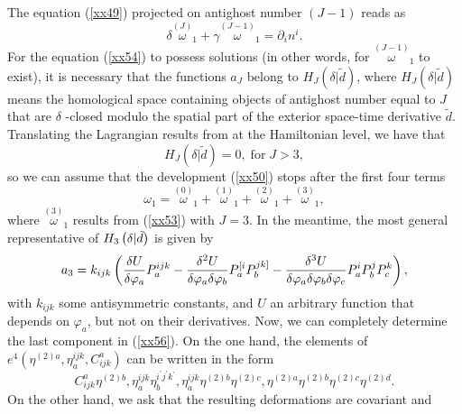 \documentclass[a4paper,12pt]{article}
\begin{document}
The equation (\ref{xx49}) projected on antighost number $\left( J-1\right) $
reads as 
\begin{equation}
\delta \stackrel{(J)}{\omega }_{1}+\gamma \stackrel{(J-1)}{\omega }%
_{1}=\partial _{i}n^{i}.  \label{xx54}
\end{equation}
For the equation (\ref{xx54}) to possess solutions (in other words, for $%
\stackrel{(J-1)}{\omega }_{1}$ to exist), it is necessary that the functions 
$a_{J}$ belong to $H_{J}\left( \delta |\tilde{d}\right) $, where $%
H_{J}\left( \delta |\tilde{d}\right) $ means the homological space
containing objects of antighost number equal to $J$ that are $\delta $%
-closed modulo the spatial part of the exterior space-time derivative $%
\tilde{d}$. Translating the Lagrangian results from \cite{gen} at the
Hamiltonian level, we have that 
\begin{equation}
H_{J}\left( \delta |\tilde{d}\right) =0,\;\mathrm{for}\;J>3,  \label{xx55}
\end{equation}
so we can assume that the development (\ref{xx50}) stops after the first
four terms 
\begin{equation}
\omega _{1}=\stackrel{(0)}{\omega }_{1}+\stackrel{(1)}{\omega }_{1}+%
\stackrel{(2)}{\omega }_{1}+\stackrel{(3)}{\omega }_{1},  \label{xx56}
\end{equation}
where $\stackrel{(3)}{\omega }_{1}$ results from (\ref{xx53}) with $J=3$. In
the meantime, the most general representative of $H_{3}\left( \delta |\tilde{%
d}\right) $ is given by 
\begin{equation}
a_{3}=k_{ijk}\left( \frac{\delta U}{\delta \varphi _{a}}P_{a}^{ijk}-\frac{%
\delta ^{2}U}{\delta \varphi _{a}\delta \varphi _{b}}P_{a}^{[i}P_{b}^{jk]}-%
\frac{\delta ^{3}U}{\delta \varphi _{a}\delta \varphi _{b}\delta \varphi _{c}%
}P_{a}^{i}P_{b}^{j}P_{c}^{k}\right) ,  \label{xx57}
\end{equation}
with $k_{ijk}$ some antisymmetric constants, and $U$ an arbitrary function
that depends on $\varphi _{a}$, but not on their derivatives. Now, we can
completely determine the last component in (\ref{xx56}). On the one hand,
the elements of $e^{4}\left( \eta ^{(2)a},\eta _{a}^{ijk},C_{ijk}^{a}\right) 
$ can be written in the form 
\begin{equation}
C_{ijk}^{a}\eta ^{(2)b},\eta _{a}^{ijk}\eta _{b}^{i^{\prime }j^{\prime
}k^{\prime }},\eta _{a}^{ijk}\eta ^{(2)b}\eta ^{(2)c},\eta ^{(2)a}\eta
^{(2)b}\eta ^{(2)c}\eta ^{(2)d}.  \label{xx58}
\end{equation}
On the other hand, we ask that the resulting deformations are covariant and
\end{document}
